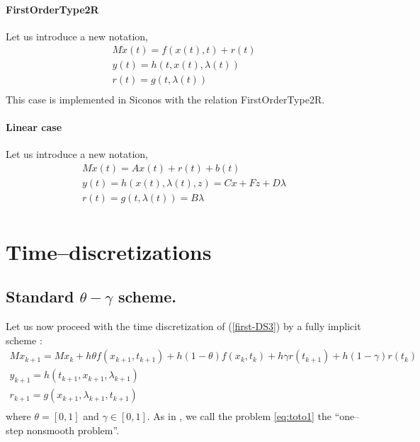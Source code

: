 \paragraph{FirstOrderType2R}
Let us introduce a new notation, 
\begin{equation}
\begin{array}{l}
M \dot{x}(t) = f(x(t),t) + r(t)  \\[2mm]
y(t) = h(t,x(t),\lambda (t)) \\[2mm]
r(t) = g(t,\lambda (t) ) \\[2mm]
\end{array}
\label{first-DS2}
\end{equation}
This case is implemented in Siconos with the relation FirstOrderType2R.




\paragraph{Linear case }Let us introduce a new notation, 
\begin{equation}
\begin{array}{l}
M \dot{x}(t) = Ax(t) + r(t)  +b(t)\\[2mm]
y(t) = h(x(t),\lambda (t),z) = Cx + Fz + D \lambda  \\[2mm]
r(t) = g(t,\lambda (t) ) = B \lambda \\[2mm]
\end{array}
\label{first-DS3}
\end{equation}


\section{Time--discretizations}



\subsection{Standard $\theta-\gamma$ scheme.}
Let us now proceed with the time discretization of (\ref{first-DS3}) by a fully implicit scheme : 
\begin{equation}
  \begin{array}{l}
    \label{eq:toto1}
     M x_{k+1} = M x_{k} +h\theta f(x_{k+1},t_{k+1})+h(1-\theta) f(x_k,t_k) + h \gamma r(t_{k+1})
     + h(1-\gamma)r(t_k)  \\[2mm]
     y_{k+1} =  h(t_{k+1},x_{k+1},\lambda _{k+1}) \\[2mm]
     r_{k+1} = g(x_{k+1},\lambda_{k+1},t_{k+1})\\[2mm]
  \end{array}
\end{equation}
where $\theta = [0,1]$ and $\gamma \in [0,1]$. As in \cite{acary2008}, we call the problem \eqref{eq:toto1} the ``one--step nonsmooth problem''.



